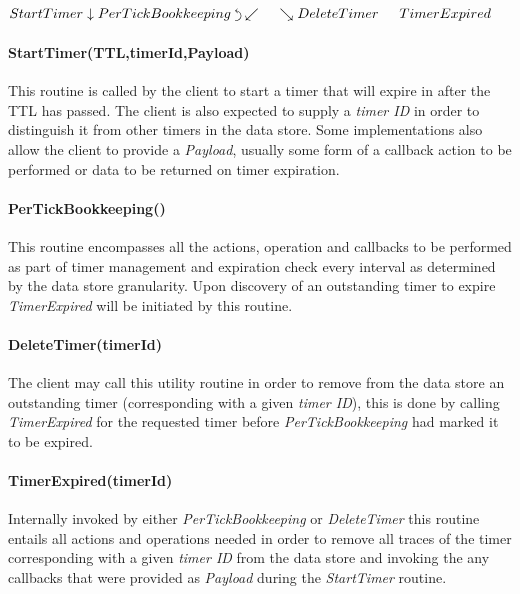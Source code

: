 \documentclass[conference]{IEEEtran}
\newcommand{\backtrackarrow}{\rotatebox[origin=c]{-90}{$\curvearrowleft$}}
\begin{document}
\begin{center}
	$
	StartTimer \linebreak 
	\downarrow \linebreak  
	PerTickBookkeeping \hspace{1mm} \backtrackarrow \linebreak 
	\swarrow  \hspace{15pt}  \searrow \linebreak 
	DeleteTimer \hspace{15pt} TimerExpired
	$
\end{center}


\paragraph{\textbf{StartTimer(TTL,timerId,Payload)}} This routine is called by the client to start a timer that will expire in after the TTL has passed. The client is also expected to supply a \textit{timer ID} in order to distinguish it from other timers in the data store. Some implementations also allow the client to provide a \textit{Payload}, usually some form of a callback action to be performed or data to be returned on timer expiration.

\paragraph{\textbf{PerTickBookkeeping()}} This routine encompasses all the actions, operation and callbacks to be performed as part of timer management and expiration check every interval as determined by the data store granularity. Upon discovery of an outstanding timer to expire \textit{TimerExpired} will be initiated by this routine.

\paragraph{\textbf{DeleteTimer(timerId)}} The client may call this utility routine in order to remove from the data store an outstanding timer (corresponding with a given \textit{timer ID}), this is done by calling \textit{TimerExpired} for the requested timer before \textit{PerTickBookkeeping} had marked it to be expired.

\paragraph{\textbf{TimerExpired(timerId})} Internally invoked by either \textit{PerTickBookkeeping} or \textit{DeleteTimer} this routine entails all actions and operations needed in order to remove all traces of the timer corresponding with a given \textit{timer ID} from the data store and invoking the any callbacks that were provided as \textit{Payload} during the \textit{StartTimer} routine.
\end{document}
